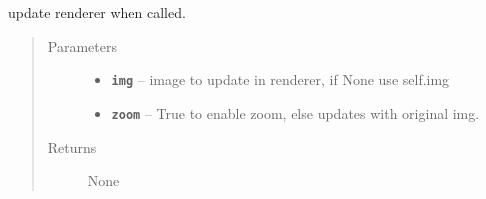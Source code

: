 \documentclass[letterpaper,10pt,english]{sphinxmanual}
\begin{document}
\begin{fulllineitems}
\begin{fulllineitems}
\label{RRtoolbox.lib:RRtoolbox.lib.plotter.MatchExplorer.updaterenderer}
update renderer when called.
\begin{quote}\begin{description}
\item[{Parameters}] \leavevmode\begin{itemize}
\item {} 
\textbf{\texttt{img}} -- image to update in renderer, if None use self.img

\item {} 
\textbf{\texttt{zoom}} -- True to enable zoom, else updates with original img.

\end{itemize}

\item[{Returns}] \leavevmode
None

\end{description}\end{quote}

\end{fulllineitems}


\end{fulllineitems}

\end{document}
